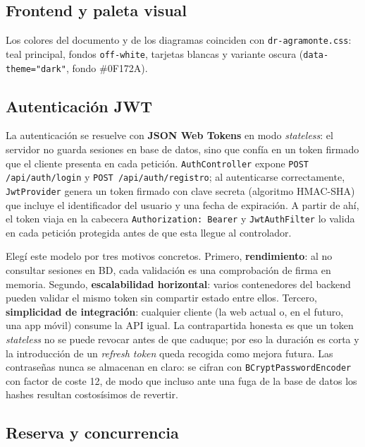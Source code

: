 \documentclass[12pt,a4paper]{report}
\begin{document}
\subsection{Frontend y paleta visual}

Los colores del documento y de los diagramas coinciden con \texttt{dr-agramonte.css}: teal principal, fondos \texttt{off-white}, tarjetas blancas y variante oscura (\texttt{data-theme="dark"}, fondo \#0F172A).



\subsection{Autenticación JWT}

La autenticación se resuelve con \textbf{JSON Web Tokens} en modo \emph{stateless}: el servidor no guarda sesiones en base de datos, sino que confía en un token firmado que el cliente presenta en cada petición. \texttt{AuthController} expone \texttt{POST /api/auth/login} y \texttt{POST /api/auth/registro}; al autenticarse correctamente, \texttt{JwtProvider} genera un token firmado con clave secreta (algoritmo HMAC-SHA) que incluye el identificador del usuario y una fecha de expiración. A partir de ahí, el token viaja en la cabecera \texttt{Authorization: Bearer} y \texttt{JwtAuthFilter} lo valida en cada petición protegida antes de que esta llegue al controlador.

Elegí este modelo por tres motivos concretos. Primero, \textbf{rendimiento}: al no consultar sesiones en BD, cada validación es una comprobación de firma en memoria. Segundo, \textbf{escalabilidad horizontal}: varios contenedores del backend pueden validar el mismo token sin compartir estado entre ellos. Tercero, \textbf{simplicidad de integración}: cualquier cliente (la web actual o, en el futuro, una app móvil) consume la API igual. La contrapartida honesta es que un token \emph{stateless} no se puede revocar antes de que caduque; por eso la duración es corta y la introducción de un \emph{refresh token} queda recogida como mejora futura. Las contraseñas nunca se almacenan en claro: se cifran con \texttt{BCryptPasswordEncoder} con factor de coste 12, de modo que incluso ante una fuga de la base de datos los hashes resultan costosísimos de revertir.

\subsection{Reserva y concurrencia}
\end{document}
